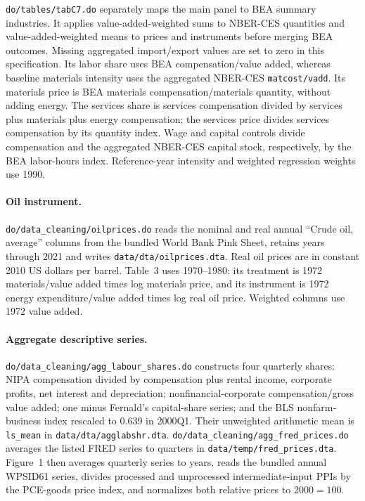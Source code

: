 \documentclass[11pt]{article}
\newcommand{\pkgfile}[1]{\nolinkurl{#1}}
\begin{document}
\pkgfile{do/tables/tabC7.do} separately maps the main panel to BEA summary
industries. It applies value-added-weighted sums to NBER-CES quantities and
value-added-weighted means to prices and instruments before merging BEA
outcomes. Missing aggregated import/export values are set to zero in this
specification. Its labor share uses BEA compensation/value added, whereas
baseline materials intensity uses the aggregated NBER-CES
\pkgfile{matcost/vadd}. Its materials price is BEA materials
compensation/materials quantity, without adding energy. The services share
is services compensation divided by services plus materials plus energy
compensation; the services price divides services compensation by its
quantity index. Wage and capital controls divide compensation and the
aggregated NBER-CES capital stock, respectively, by the BEA labor-hours
index. Reference-year intensity and weighted regression weights use 1990.

\paragraph{Oil instrument.}
\pkgfile{do/data_cleaning/oilprices.do} reads the nominal and real annual
``Crude oil, average'' columns from the bundled World Bank Pink Sheet,
retains years through 2021 and writes \pkgfile{data/dta/oilprices.dta}.
Real oil prices are in constant 2010 US dollars per barrel. Table~3 uses 1970--1980:
its treatment is 1972 materials/value added times log materials price,
and its instrument is 1972 energy expenditure/value added times log real
oil price. Weighted columns use 1972 value added.

\paragraph{Aggregate descriptive series.}
\pkgfile{do/data_cleaning/agg_labour_shares.do} constructs four quarterly
shares: NIPA compensation divided by compensation plus rental income,
corporate profits, net interest and depreciation; nonfinancial-corporate
compensation/gross value added; one minus Fernald's capital-share series;
and the BLS nonfarm-business index rescaled to 0.639 in 2000Q1. Their
unweighted arithmetic mean is \pkgfile{ls_mean} in
\pkgfile{data/dta/agglabshr.dta}.
\pkgfile{do/data_cleaning/agg_fred_prices.do} averages the listed FRED
series to quarters in \pkgfile{data/temp/fred_prices.dta}. Figure~1 then
averages quarterly series to years, reads the bundled annual WPSID61
series, divides processed and unprocessed intermediate-input PPIs by the
PCE-goods price index, and normalizes both relative prices to 2000$=100$.
\end{document}
